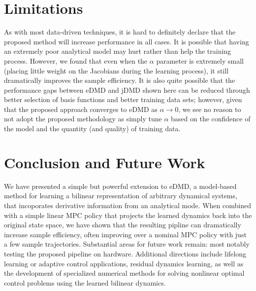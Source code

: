 \documentclass{article}
\begin{document}
      \section{Limitations} \label{sec:limitations}
      As with most data-driven techniques, it is hard to definitely declare that the proposed 
      method will increase performance in all cases. It is possible that having an extremely poor
      analytical model may hurt rather than help the training process. However, we found that even
      when the $\alpha$ parameter is extremely small (placing little weight on the Jacobians 
      during the learning process), it still dramatically improves the sample efficiency. It is 
      also quite possible that the performance gaps between eDMD and jDMD shown here can be 
      reduced through better selection of basis functions and better training data sets; however,
      given that the proposed approach converges to eDMD as $\alpha \rightarrow 0$, we see no 
      reason to not adopt the proposed methodology as simply tune $\alpha$ based on the 
      confidence of the model and the quantity (and quality) of training data.
      
      
      \section{Conclusion and Future Work} \label{sec:conclusion}
      We have presented a simple but powerful extension to eDMD, a model-based method for learning
      a bilinear representation of arbitrary dynamical systems, that incoporates derivative 
      information from an analytical mode. When combined with a simple linear
      MPC policy that projects the learned dynamics back into the original state space, we have 
      shown that the resulting pipline can dramatically increase sample efficiency, often 
      improving over a nominal MPC policy with just a few sample trajectories. Substantial areas 
      for future work remain: most notably testing the proposed pipeline on hardware. Additional 
      directions include lifelong learning or adaptive control applications, residual dynamics 
      learning, as well as the development of specialized numerical methods for solving nonlinear 
      optimal control problems using the learned bilinear dynamics.
      
      
      
      
\end{document}
